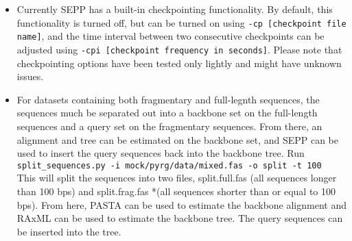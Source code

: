 \documentclass[11pt]{article} %
\newcommand{\sepp}{SEPP\xspace}
\newcommand{\ins}[1]{{\tt #1}}
\newcommand{\file}[1]{{\sf #1}}
\newcommand{\pplacer}{pplacer\xspace}
\begin{document}
\begin{itemize}
tells \sepp that \pplacer binaries can be found under \file{/some/path}.

An example config file is available as part of the distribution under the test directory (\file{test/unittest/data/simulated/sample.config}). 
A main configuration file under \file{\{home\}/.sepp/main.config} is used
to store some basic configurations such as the location of extra programs, etc.
When conflicting options are given, precedence is with those provided through commandline, then those specified in config file provided using \ins{-c} option and finally those specified in the main config file.  To test running from the config file, \ins{cd simulated} directory and run\\
\ins{run\_sepp.py -c test.config}

\item Currently \sepp has a built-in checkpointing functionality.
By default, this functionality is turned off, but can be turned on using \ins{-cp [checkpoint file name]}, 
and the time interval between two consecutive checkpoints can be adjusted using \ins{-cpi [checkpoint frequency in seconds]}.
Please note that checkpointing options have been tested only lightly and might have unknown issues. 

\item For datasets containing both fragmentary and full-legnth sequences, the sequences much be separated out into a backbone set on the full-length sequences and a query set on the fragmentary sequences.  From there, an alignment and tree can be estimated on the backbone set, and SEPP can be used to insert the query sequences back into the backbone tree.  Run 
\ins{split\_sequences.py -i mock/pyrg/data/mixed.fas -o split -t 100}\\

This will split the sequences into two files, split.full.fas (all sequences longer than 100 bps) and split.frag.fas *(all sequences shorter than or equal to 100 bps).  From here, PASTA can be used to estimate the backbone alignment and RAxML can be used to estimate the backbone tree.  The query sequences can be inserted into the tree.
\end{itemize}




\end{document}
